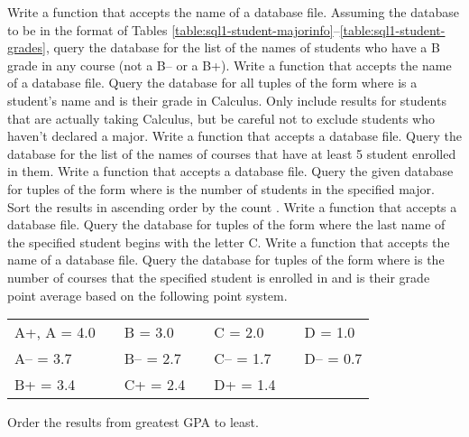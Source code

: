 Write a function that accepts the name of a database file.
Assuming the database to be in the format of Tables \ref{table:sql1-student-majorinfo}--\ref{table:sql1-student-grades}, query the database for the list of the names of students who have a B grade in any course (not a B-- or a B+).
Write a function that accepts the name of a database file.
Query the database for all tuples of the form  where  is a student's name and  is their grade in Calculus.
Only include results for students that are actually taking Calculus, but be careful not to exclude students who haven't declared a major.
Write a function that accepts a database file.
Query the database for the list of the names of courses that have at least 5 student enrolled in them.
Write a function that accepts a database file.
Query the given database for tuples of the form  where  is the number of students in the specified major.
Sort the results in ascending order by the count .
Write a function that accepts a database file.
Query the database for tuples of the form  where the last name of the specified student begins with the letter C.
Write a function that accepts the name of a database file.
Query the database for tuples of the form  where  is the number of courses that the specified student is enrolled in and  is their grade point average based on the following point system.

\begin{center}
\begin{tabular}{lclclcl}
A+, A   = 4.0 & & B   = 3.0 & & C   = 2.0 & & D   = 1.0 \\
    A-- = 3.7 & & B-- = 2.7 & & C-- = 1.7 & & D-- = 0.7 \\
    B+  = 3.4 & & C+  = 2.4 & & D+  = 1.4 & &
\end{tabular}
\end{center}
Order the results from greatest GPA to least.
